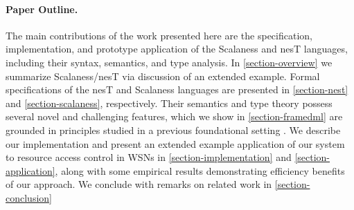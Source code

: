 \snowcloudfig

\paragraph{Paper Outline.} The main contributions of the work presented here are the
specification, implementation, and proto\-type application of the Scalaness and nesT languages,
including their syntax, semantics, and type analysis. In \autoref{section-overview} we summarize
Scalaness/nesT via discussion of an extended example. Formal specifications of the nesT and
Scalaness languages are presented in \autoref{section-nest} and \autoref{section-scalaness},
respectively. Their semantics and type theory possess several novel and challenging features,
which we show in \autoref{section-framedml} are grounded in principles studied in a previous
foundational setting \cite{FramedML}. We describe our implementation and present an extended
example application of our system to resource access control in WSNs in
\autoref{section-implementation} and \autoref{section-application}, along with some empirical
results demonstrating efficiency benefits of our approach. We conclude with remarks on related
work in \autoref{section-conclusion}

%
%

